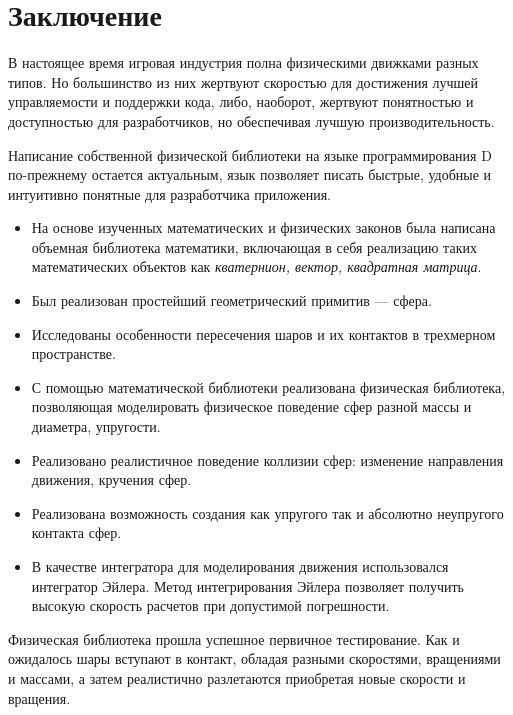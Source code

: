\chapter*{Заключение}

В настоящее время игровая индустрия полна физическими движками разных типов. Но большинство из них жертвуют скоростью 
для достижения лучшей управляемости и поддержки кода, либо, наоборот, жертвуют понятностью и доступностью для разработчиков,
но обеспечивая лучшую производительность.

Написание собственной физической библиотеки на языке программирования D по-прежнему остается актуальным,
язык позволяет писать быстрые, удобные и интуитивно понятные для разработчика приложения.

\begin{itemize}
 \item На основе изученных математических и физических законов была написана объемная библиотека математики,
включающая в себя реализацию таких математических объектов как \textit{кватернион, вектор, квадратная матрица}.
 \item Был реализован простейший геометрический примитив --- сфера.
 \item Исследованы особенности пересечения шаров и их контактов в трехмерном пространстве. 
 \item С помощью математической библиотеки реализована физическая библиотека, позволяющая моделировать физическое поведение
сфер разной массы и диаметра, упругости.
 \item Реализовано реалистичное поведение коллизии сфер: изменение направления движения, кручения сфер.
 \item Реализована возможность создания как упругого так и абсолютно неупругого контакта сфер.
 \item В качестве интегратора для моделирования движения использовался интегратор Эйлера. Метод интегрирования Эйлера позволяет получить высокую скорость расчетов
при допустимой погрешности.
\end{itemize}

Физическая библиотека прошла успешное первичное тестирование. Как и ожидалось шары вступают в контакт,
обладая разными скоростями, вращениями и массами, а затем реалистично разлетаются приобретая новые скорости и вращения.